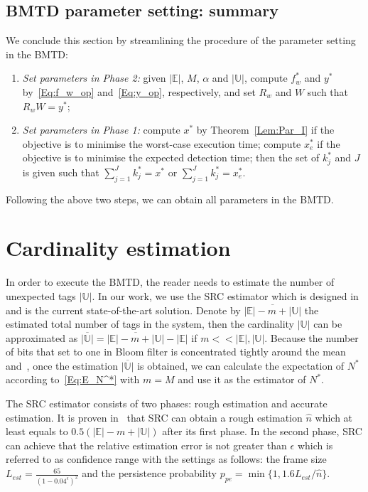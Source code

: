 \documentclass[10pt, twocolumn]{IEEEtran}
\begin{document}
\subsection{BMTD parameter setting: summary}

We conclude this section by streamlining the procedure of the parameter setting in the BMTD:
\begin{enumerate}
\item \emph{Set parameters in Phase 2:} given ${|\mathbb{E}|}$, $M$, $\alpha$ and ${|\mathbb{U}|}$, compute $f^*_w$ and $y^*$
      by~\eqref{Eq:f_w_op} and~\eqref{Eq:y_op}, respectively, and set $R_w$ and $W$ such that $R_wW=y^*$;
\item \emph{Set parameters in Phase 1:} compute $x^*$ by Theorem~\ref{Lem:Par_I} if the objective is to minimise the worst-case execution time; compute $x^*_e$ if the objective is to minimise the expected detection time; then the set of $k_j^*$ and $J$ is given such that $\sum_{j=1}^J k_j^*=x^*$ or $\sum_{j=1}^J k_j^*=x^*_e$.
\end{enumerate}
Following the above two steps, we can obtain all parameters in the BMTD.

\section{Cardinality estimation}
\label{sec:estimation}
In order to execute the BMTD, the reader needs to estimate the number of unexpected tags $|\mathbb{U}|$. In our work, we use the SRC estimator which is designed in~\cite{chen2013understanding} and is the current state-of-the-art solution. Denote by $\overline{|\mathbb{E}|-m + |\mathbb{U}|}$ the estimated total number of tags in the system, then the cardinality $|\mathbb{U}|$ can be approximated as $\overline {|\mathbb{U}|} = \overline{|\mathbb{E}|-m + |\mathbb{U}|}-|\mathbb{E}|$ if $m<<|\mathbb{E}|, |\mathbb{U}|$.
Because the number of bits that set to one in Bloom filter is concentrated tightly around the mean~\cite{mitzenmacher2005probability} and~\cite{hao2007building}, once the estimation $\overline {|\mathbb{U}|}$ is obtained, we can calculate the expectation of $N^*$ according to~\eqref{Eq:E_N^*} with $m=M$ and use it as the estimator of $N^*$.

The SRC estimator consists of two phases: rough estimation and accurate estimation. It is proven in~\cite{chen2013understanding} that SRC can obtain a rough estimation $\hat{n}$ which at least equals to $0.5({|\mathbb{E}|-m + |\mathbb{U}|}) $ after its first phase. In the second phase, SRC can achieve that the relative estimation error is not greater than $\epsilon$ which is referred to as confidence range with the settings as follows: the frame size $L_{est}=\frac{65}{(1-0.04^\epsilon)^2}$ and the persistence probability $p_{pe} = \min\{1,1.6 L_{est}/\hat{n}\}$.
\end{document}
